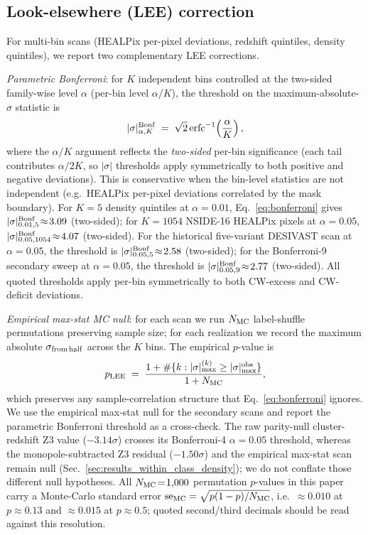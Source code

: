 \documentclass[twocolumn,linenumbers]{aastex702}
\begin{document}
\subsection{Look-elsewhere (LEE) correction}\label{sec:lee}

For multi-bin scans (HEALPix per-pixel deviations, redshift quintiles,
density quintiles), we report two complementary LEE corrections.

\emph{Parametric Bonferroni}: for $K$ independent bins controlled at
the two-sided family-wise level $\alpha$ (per-bin level $\alpha/K$),
the threshold on the maximum-absolute-$\sigma$ statistic is
\begin{equation}\label{eq:bonferroni}
|\sigma|^{\rm Bonf}_{\alpha,K} \;=\; \sqrt{2}\,
\mathrm{erfc}^{-1}\!\left(\frac{\alpha}{K}\right),
\end{equation}
where the $\alpha/K$ argument reflects the \emph{two-sided} per-bin
significance (each tail contributes $\alpha/2K$, so $|\sigma|$
thresholds apply symmetrically to both positive and negative
deviations). This is conservative when the bin-level statistics are not
independent (e.g.\ HEALPix per-pixel deviations correlated by the
mask boundary). For $K\!=\!5$ density quintiles at $\alpha\!=\!0.01$,
Eq.~\eqref{eq:bonferroni} gives $|\sigma|^{\rm Bonf}_{0.01,5}\!\approx\!3.09$
(two-sided); for $K\!=\!1054$ NSIDE-16 HEALPix pixels at $\alpha\!=\!0.05$,
$|\sigma|^{\rm Bonf}_{0.05,1054}\!\approx\!4.07$ (two-sided). For the
historical five-variant DESIVAST scan at $\alpha\!=\!0.05$, the threshold is
$|\sigma|^{\rm Bonf}_{0.05,5}\!\approx\!2.58$ (two-sided); for the Bonferroni-9
secondary sweep at $\alpha\!=\!0.05$, the threshold is
$|\sigma|^{\rm Bonf}_{0.05,9}\!\approx\!2.77$ (two-sided). All quoted
thresholds apply per-bin symmetrically to both CW-excess and CW-deficit
deviations.

\emph{Empirical max-stat MC null}: for each scan we run $N_{\rm MC}$
label-shuffle permutations preserving sample size; for each
realization we record the maximum absolute $\sigma_{\rm from\,half}$
across the $K$ bins. The empirical $p$-value is
\begin{equation}\label{eq:empirical_p}
p_{\rm LEE} \;=\; \frac{1 + \#\{k : |\sigma|_{\max}^{(k)} \ge |\sigma|_{\max}^{\rm obs}\}}{1 + N_{\rm MC}},
\end{equation}
which preserves any sample-correlation structure that
Eq.~\eqref{eq:bonferroni} ignores. We use the empirical max-stat
null for the secondary scans and report the parametric Bonferroni threshold as a
cross-check. The raw parity-null cluster-redshift Z3 value
($-3.14\sigma$) crosses its Bonferroni-4 $\alpha=0.05$ threshold, whereas
the monopole-subtracted Z3 residual ($-1.50\sigma$) and the empirical
max-stat scan remain null (Sec.~\ref{sec:results_within_class_density});
we do not conflate those different null hypotheses. All
$N_{\rm MC}\!=\!1{,}000$ permutation
$p$-values in this paper carry a Monte-Carlo standard error
${\rm se}_{\rm MC} = \sqrt{p(1-p)/N_{\rm MC}}$, i.e.\
${\approx}0.010$ at $p \approx 0.13$ and ${\approx}0.015$ at
$p \approx 0.5$; quoted second/third decimals should be read against
this resolution.
\end{document}
